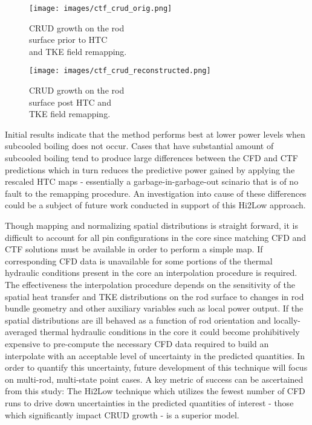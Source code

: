 \begin{figure}[!htbp]
\centering
\begin{minipage}{.45\textwidth}
  \texttt{[image: images/ctf\_crud\_orig.png]}
\caption{CRUD growth on the rod \\ surface prior to HTC \\ and TKE field remapping.}
\label{fig:crud_pre_map}
\end{minipage}%
\begin{minipage}{.45\textwidth}
  \texttt{[image: images/ctf\_crud\_reconstructed.png]}
\caption{CRUD growth on the rod \\ surface post HTC and \\ TKE field remapping.}
\label{fig:crud_post_map}
\end{minipage}
\end{figure}

Initial results indicate that the method performs best at lower power levels when subcooled boiling does not occur.  Cases that have substantial amount of subcooled boiling tend to produce large differences between the CFD and CTF predictions which in turn reduces the predictive power gained by applying the rescaled HTC maps - essentially a garbage-in-garbage-out scinario that is of no fault to the remapping procedure.  An investigation into cause of these differences could be a subject of future work conducted in support of this Hi2Low approach.  

Though mapping and normalizing spatial distributions is straight forward, it is difficult to account for all pin configurations in the core since matching CFD and CTF solutions must be available in order to perform a simple map.  If corresponding CFD data is unavailable for some portions of the thermal hydraulic conditions present in the core an interpolation procedure is required.  The effectiveness the interpolation procedure depends on the sensitivity of the spatial heat transfer and TKE distributions on the rod surface to changes in rod bundle geometry and other auxiliary variables such as local power output.  If the spatial distributions are ill behaved as a function of rod orientation and locally-averaged thermal hydraulic conditions in the core it could become prohibitively expensive to pre-compute the necessary CFD data required to build an interpolate with an acceptable level of uncertainty in the predicted quantities.  In order to quantify this uncertainty, future development of this technique will focus on multi-rod, multi-state point cases.
A key metric of success can be ascertained from this study:  The Hi2Low technique which utilizes the fewest number of CFD runs to drive down uncertainties in the predicted quantities of interest - those which significantly impact CRUD growth - is a superior model.

